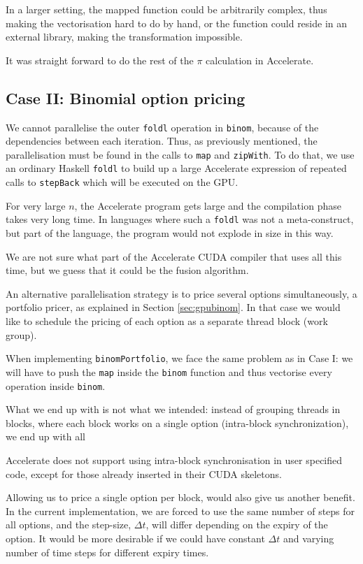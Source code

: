 \documentclass[preprint]{sigplanconf}
\begin{document}
In a larger setting, the mapped function could be arbitrarily complex,
thus making the vectorisation hard to do by hand, or the function could
reside in an external library, making the transformation impossible.

It was straight forward to do the rest of the $\pi$ calculation in
Accelerate.

\subsection{Case II: Binomial option pricing}
We cannot parallelise the outer \verb|foldl| operation in
\verb|binom|, because of the dependencies between each
iteration. Thus, as previously mentioned, the parallelisation must be
found in the calls to \verb|map| and \verb|zipWith|. To do that, we
use an ordinary Haskell \verb|foldl| to build up a large Accelerate
expression of repeated calls to \verb|stepBack| which will be executed
on the GPU.

For very large $n$, the Accelerate program gets large and the
compilation phase takes very long time. In languages where such a
\verb|foldl| was not a meta-construct, but part of the language, the
program would not explode in size in this way.

We are not sure what part of the Accelerate CUDA compiler that uses
all this time, but we guess that it could be the fusion algorithm.

An alternative parallelisation strategy is to price several options
simultaneously, a portfolio pricer, as explained in Section
\ref{sec:gpubinom}. In that case we would like to schedule the pricing
of each option as a separate thread block (work group).

When implementing \verb|binomPortfolio|, we face the same problem as
in Case I: we will have to push the \verb|map| inside the \verb|binom|
function and thus vectorise every operation inside \verb|binom|. 

What we end up with is not what we intended: instead of grouping
threads in blocks, where each block works on a single option
(intra-block synchronization), we end up with all

Accelerate does not support using intra-block synchronisation in user
specified code, except for those already inserted in their CUDA skeletons.

Allowing us to price a single option per block, would also give us
another benefit. In the current implementation, we are forced to use
the same number of steps for all options, and the step-size, $\Delta
t$, will differ depending on the expiry of the option. It would be
more desirable if we could have constant $\Delta t$ and varying number
of time steps for different expiry times.
\end{document}
